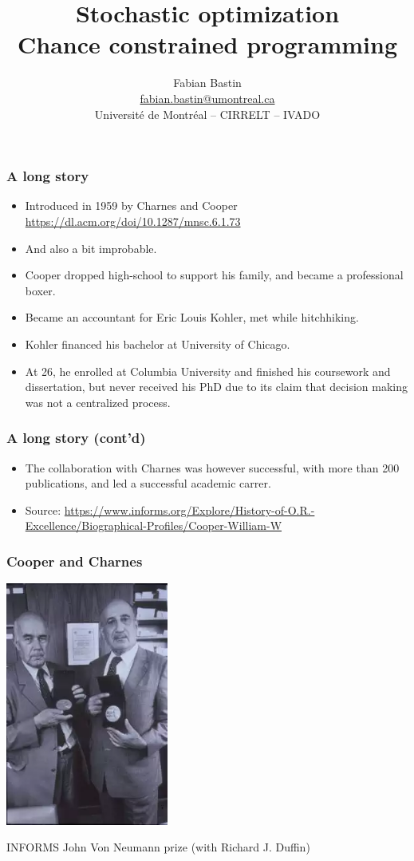 \documentclass{beamer}
\title[CP]{Stochastic optimization\\Chance constrained programming}
\author[Fabian Bastin]{Fabian Bastin \\ \url{fabian.bastin@umontreal.ca} \\ Université de Montréal -- CIRRELT -- IVADO}
\date{}
\begin{document}

\frame{\titlepage}

\begin{frame}
\frametitle{A long story}

\begin{itemize}
	\item 
Introduced in 1959 by Charnes and Cooper \url{https://dl.acm.org/doi/10.1287/mnsc.6.1.73}
	\item 
And also a bit improbable.
	\item 
Cooper dropped high-school to support his family, and became a professional boxer.
	\item 
Became an accountant for Eric Louis Kohler, met while hitchhiking.
	\item 
Kohler financed his bachelor at University of Chicago.
\item
At 26, he enrolled at Columbia University and finished his coursework and dissertation, but never received his PhD due to its claim that decision making was not a centralized process.
\end{itemize}

\end{frame}

\begin{frame}
\frametitle{A long story (cont'd)}
	
\begin{itemize}
\item
The collaboration with Charnes was however successful, with more than 200 publications, and led a successful academic carrer.
\item 
Source: \url{https://www.informs.org/Explore/History-of-O.R.-Excellence/Biographical-Profiles/Cooper-William-W}
\end{itemize}

\end{frame}

\begin{frame}[fragile]
\frametitle{Cooper and Charnes}

\begin{center}
\includegraphics[width=0.4\textwidth]{imgs/coopercharnes.png}

INFORMS John Von Neumann prize (with Richard J. Duffin)
\end{center}

\end{frame}
\end{document}
